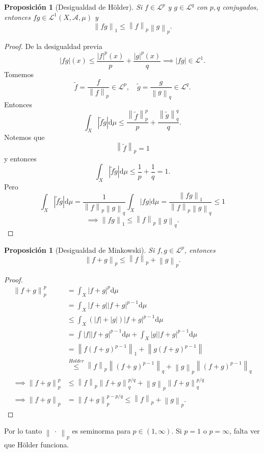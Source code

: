 \documentclass{article}
\newtheorem{proposition}[theorem]{Proposición}
\theoremstyle{definition}
\theoremstyle{remark}
\numberwithin{equation}{section}
\newcommand{\Acal}{\mathcal{A}}
\newcommand{\Lcal}{\mathcal{L}}
\renewcommand{\d}{\mathrm{d}}
\newcommand{\oo}{\infty}
\renewcommand{\tilde}{\widetilde}
\newcommand{\abs}[1]{\left| #1 \right|}
\newcommand{\norm}[1]{\left\lVert #1 \right\rVert}
\begin{document}
\begin{proposition}
  [Desigualdad de Hölder]
  Si $f \in \Lcal^p$ y $g \in \Lcal^q$ con $p,q$ conjugados, entonces $fg \in \Lcal^1(X,\Acal,\mu)$ y 
  \[ \norm{fg}_1 \leq \norm{f}_p \norm{g}_p. \]
\end{proposition}
\begin{proof}
  De la desigualdad previa 
  \[ \abs{fg}(x) \leq \frac{\abs{f}^p(x)}{p} + \frac{\abs{g}^p(x)}{q} \implies \abs{fg} \in \Lcal^1. \]
  Tomemos 
  \[ \tilde f = \frac{f}{\norm{f}_p} \in \Lcal^p, \quad \tilde g = \frac{g}{\norm{g}_q} \in \Lcal^q. \]
  Entonces 
  \[ \int_X \abs{\tilde f \tilde g} \d\mu \leq \frac{\norm{\tilde f}_p^p}{p} + \frac{\norm{\tilde g}_q^q}{q}. \]
  Notemos que 
  \[ \norm{\tilde f}_p = 1 \]
  y entonces 
  \[ \int_X \abs{\tilde f \tilde g} \d\mu \leq \frac{1}{p} + \frac{1}{q} = 1. \]
  Pero 
  \[ \int_X \abs{\tilde f \tilde g} \d\mu = \frac{1}{\norm{f}_p \norm{g}_q} \int_X \abs{fg} \d\mu = \frac{\norm{fg}_1}{\norm{f}_p \norm{g}_q} \leq 1 \]
  \[\implies \norm{fg}_1 \leq \norm{f}_p \norm{g}_q.\]
\end{proof}

\begin{proposition}
  [Desigualdad de Minkowski]
  Si $f,g \in \Lcal^p$, entonces 
  \[ \norm{f+g}_p \leq \norm{f}_p + \norm{g}_p. \]
\end{proposition}
\begin{proof}
  \begin{align*}
    \norm{f+g}_p^p &= \int_X \abs{f+g}^p \d\mu \\
    &= \int_X \abs{f+g} \abs{f+g}^{p-1} \d\mu \\
    &\leq \int_X (\abs f + \abs g) \abs{f+g}^{p-1} \d\mu \\
    &= \int \abs f \abs{f+g}^{p-1} \d\mu + \int_X \abs g \abs{f+g}^{p-1} \d\mu \\
    &= \norm{f(f+g)^{p-1}}_1 + \norm{g(f+g)^{p-1}} \\
    &\stackrel{Holder}{\leq} \norm{f}_p \norm{(f+g)^{p-1}}_q + \norm{g}_p \norm{(f+g)^{p-1}}_q \\
    \implies \norm{f+g}_p^p &\leq \norm{f}_p \norm{f+g}_q^{p/q} + \norm{g}_p \norm{f+g}_q^{p/q} \\
    \implies \norm{f+g}_p &= \norm{f+g}_p^{p-p/q} \leq \norm{f}_p + \norm{g}_p.
  \end{align*}
\end{proof}

Por lo tanto $\norm{\ \cdot \ }_p$ es seminorma para $p \in (1,\oo)$. Si $p = 1$ o $p = \oo$, falta ver que Hölder funciona.
\end{document}
